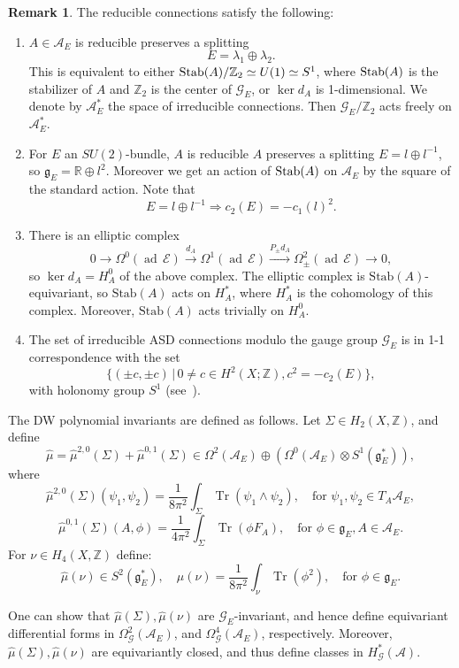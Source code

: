\documentclass[a4paper,12pt,reqno,sumlimits]{amsart}
\theoremstyle{plain}
\theoremstyle{definition}
\newtheorem{rem}[thm]{Remark}
\newcommand{\R}{{\mathbb R}}
\newcommand{\Z}{{\mathbb Z}}
\newcommand{\1}{{\bf 1}}
\newcommand{\g}{{\mathfrak  g}}
\newcommand{\calA}{{\mathcal A}}
\newcommand{\calE}{{\mathcal E}}
\newcommand{\calG}{{\mathcal G}}
\renewcommand{\to}{\longrightarrow}
\renewcommand{\iff}{\text{if and only if }}
\newcommand{\Tr}{\operatorname{Tr}}
\newcommand{\ad}{{\operatorname{ad\,}}}
\newcommand{\inv}{^{-1}}
\numberwithin{equation}{section}
\begin{document}
\begin{rem}
  The reducible connections satisfy the following:
  \begin{enumerate}
  \item $A\in\calA_E$ is reducible \iff preserves a splitting
    $$
    E=\lambda_1\oplus\lambda_2.
    $$
    This is equivalent to either $\hbox{Stab}(A)/\Z_2\simeq U(1)\simeq
    S^1$, where $\hbox{Stab}(A)$ is the stabilizer of $A$ and $\Z_2$ is the
    center of $\calG_E$, or $\ker d_A$ is 1-dimensional.  We denote by
    $\calA^*_E$ the space of irreducible connections. Then $\calG_E/\Z_2$
    acts freely on $\calA^*_E$.
  \item For $E$ an $SU(2)$-bundle, $A$ is reducible \iff $A$ preserves a
    splitting $E=l\oplus l\inv$, so $\g_E=\R\oplus l^2$. Moreover we get an
    action of $\hbox{Stab}(A)$ on $\calA_E$ by the square of the standard
    action.  Note that
    $$
    E=l\oplus l\inv\Rightarrow c_2(E)=-c_1(l)^2.
    $$
  \item There is an elliptic complex
    $$
    0\to\Omega^0(\ad{\calE})\stackrel{d_A}{\to}\Omega^1(\ad{\calE})
    \stackrel{P_{\pm}d_A}{\to}\Omega^2_{\pm}(\ad{\calE})\to 0,
    $$
    so $\ker{d_A}=H^0_A$ of the above complex.  The elliptic complex is
    $\text{Stab}(A)$-equivariant, so $\text{Stab}(A)$ acts on $H^*_A$, where
    $H_A^*$ is the cohomology of this complex.  Moreover, $\text{Stab}(A)$
    acts trivially on $H^0_A$.
  \item The set of irreducible ASD connections modulo the gauge group
    $\calG_E$ is in 1-1 correspondence with the set
    $$
    \{(\pm c,\pm c)\,|\, 0\ne c\in H^2(X;\Z), c^2=-c_2(E)\},
    $$
    with holonomy group $S^1$ (see~\cite[Prop 4.2.15]{dk}).
  \end{enumerate}
\end{rem}
The DW polynomial invariants are defined as follows.  Let $\Sigma\in
H_2(X,\Z)$, and define
$$
\hat{\mu}=\hat{\mu}^{2,0}(\Sigma)+\hat{\mu}^{0,1}(\Sigma)
\in\Omega^2(\calA_E)\oplus\left(\Omega^0(\calA_E)\otimes S^1(\g_E^*)
\right),
$$
where
$$
\hat{\mu}^{2,0}(\Sigma)(\psi_1,\psi_2)=\frac{1}{8\pi^2}
\int_\Sigma\Tr(\psi_1\wedge\psi_2),\quad\text{for }\psi_1,\psi_2\in T_A\calA_E,
$$
$$
\hat{\mu}^{0,1}(\Sigma)(A,\phi)=\frac{1}{4\pi^2}
\int_\Sigma\Tr(\phi F_A),\quad\text{for }\phi\in\g_E, A\in\calA_E.
$$
For $\nu\in H_4(X,\Z)$ define:
$$
\hat{\mu}(\nu)\in S^2\left(\g_E^*\right),\quad
\hat{\mu}(\nu)=\frac{1}{8\pi^2}\int_\nu\Tr(\phi^2),
\quad\text{for }\phi\in\g_E.
$$

One can show that $\hat{\mu}(\Sigma), \hat{\mu}(\nu)$ are $\calG_E$-invariant,
and hence define equivariant differential forms in $\Omega^2_\calG(\calA_E)$,
and $\Omega^4_\calG(\calA_E)$, respectively.  Moreover,
$\hat{\mu}(\Sigma), \hat{\mu}(\nu)$ are equivariantly closed, and thus define
classes in $H^*_\calG(\calA)$.
\end{document}
